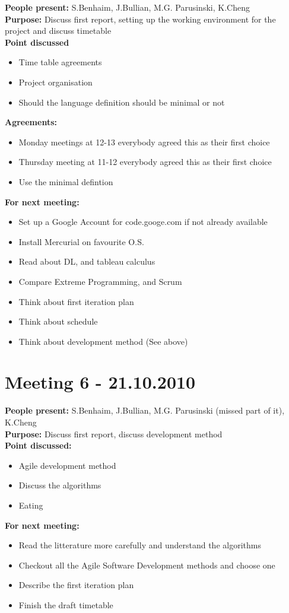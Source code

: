 \documentclass[12pt,a4paper]{article}
\begin{document}
\textbf{People present:} S.Benhaim, J.Bullian, M.G. Parusinski, K.Cheng \\
\textbf{Purpose:} Discuss first report, setting up the working environment for the project  and discuss timetable\\
\textbf{Point discussed}
\begin{itemize}
\item Time table agreements
\item Project organisation
\item Should the language definition should be minimal or not
\end{itemize}
\textbf{Agreements:}
\begin{itemize}
\item Monday meetings at 12-13 everybody agreed this as their first choice
\item Thursday meeting at 11-12 everybody agreed this as their first choice
\item Use the minimal defintion
\end{itemize}
\textbf{For next meeting:}
\begin{itemize}
\item Set up a Google Account for code.googe.com if not already available
\item Install Mercurial on favourite O.S.
\item Read about DL, and tableau calculus
\item Compare Extreme Programming, and Scrum
\item Think about first iteration plan
\item Think about schedule
\item Think about development method (See above)
\end{itemize}

\section*{Meeting 6 - 21.10.2010}

\textbf{People present:} S.Benhaim, J.Bullian, M.G. Parusinski (missed part of it), K.Cheng \\
\textbf{Purpose:} Discuss first report, discuss development method \\
\textbf{Point discussed:}
\begin{itemize}
\item Agile development method
\item Discuss the algorithms
\item Eating
\end{itemize}
\textbf{For next meeting:}
\begin{itemize}
\item Read the litterature more carefully and understand the algorithms
\item Checkout all the Agile Software Development methods and choose one
\item Describe the first iteration plan
\item Finish the draft timetable
\end{itemize}
\end{document}
